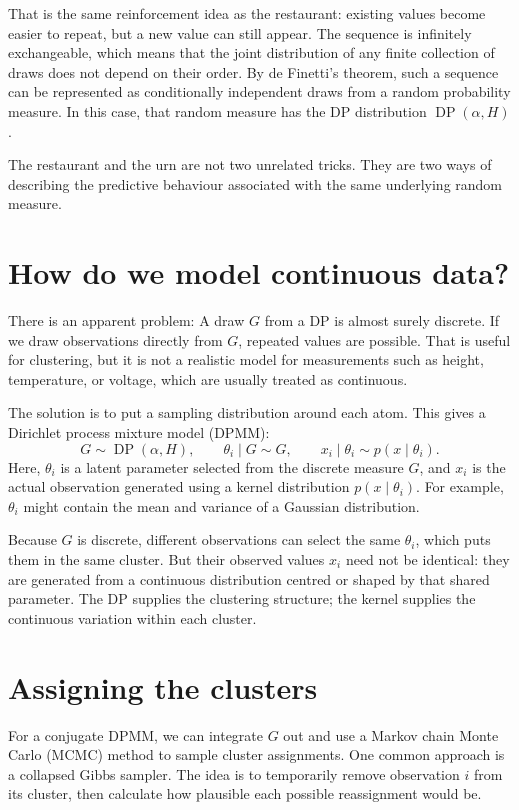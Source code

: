 \documentclass[11pt]{article}
\begin{document}
That is the same reinforcement idea as the restaurant: existing values become easier to repeat, but a new value can still appear. The sequence is infinitely exchangeable, which means that the joint distribution of any finite collection of draws does not depend on their order. By de Finetti's theorem, such a sequence can be represented as conditionally independent draws from a random probability measure. In this case, that random measure has the DP distribution \(\operatorname{DP}(\alpha,H)\).

The restaurant and the urn are not two unrelated tricks. They are two ways of describing the predictive behaviour associated with the same underlying random measure.

\section*{How do we model continuous data?}

There is an apparent problem: A draw \(G\) from a DP is almost surely discrete. If we draw observations directly from \(G\), repeated values are possible. That is useful for clustering, but it is not a realistic model for measurements such as height, temperature, or voltage, which are usually treated as continuous.

The solution is to put a sampling distribution around each atom. This gives a Dirichlet process mixture model (DPMM):
\[
G\sim\operatorname{DP}(\alpha,H),\qquad
\theta_i\mid G\sim G,\qquad
x_i\mid\theta_i\sim p(x\mid\theta_i).
\]
Here, \(\theta_i\) is a latent parameter selected from the discrete measure \(G\), and \(x_i\) is the actual observation generated using a kernel distribution \(p(x\mid\theta_i)\). For example, \(\theta_i\) might contain the mean and variance of a Gaussian distribution.

Because \(G\) is discrete, different observations can select the same \(\theta_i\), which puts them in the same cluster. But their observed values \(x_i\) need not be identical: they are generated from a continuous distribution centred or shaped by that shared parameter. The DP supplies the clustering structure; the kernel supplies the continuous variation within each cluster.

\section*{Assigning the clusters}

For a conjugate DPMM, we can integrate \(G\) out and use a Markov chain Monte Carlo (MCMC) method to sample cluster assignments. One common approach is a collapsed Gibbs sampler. The idea is to temporarily remove observation \(i\) from its cluster, then calculate how plausible each possible reassignment would be.
\end{document}

